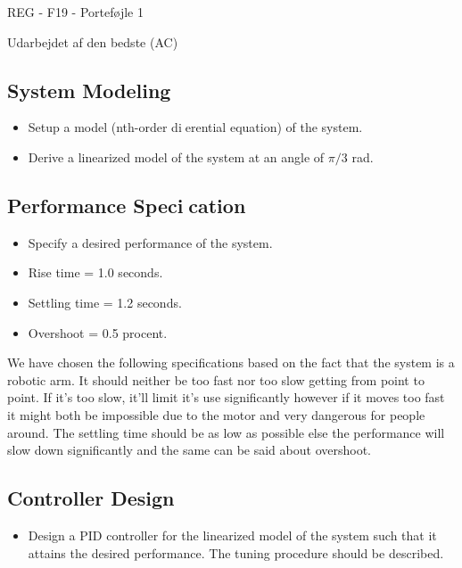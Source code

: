 \documentclass[12pt]{article}
\begin{document}
\raggedright
\huge
REG - F19 - Porteføjle 1 \linebreak
\normalsize

\large
Udarbejdet af den bedste (AC)

\subsection*{System Modeling}
\begin{itemize}
  \item Setup a model (nth-order dierential equation) of the system.
  \item Derive a linearized model of the system at an angle of $\pi/3$ rad.
\end{itemize}

\subsection*{Performance Specication}
\begin{itemize}
  \item Specify a desired performance of the system.
\end{itemize}

\begin{itemize}
  \item Rise time = 1.0 seconds.
  \item Settling time = 1.2 seconds.
  \item Overshoot = 0.5 procent.

\end{itemize}
We have chosen the following specifications based on the fact that the system is a robotic arm. It should neither be too fast nor too slow getting from point to point. If it's too slow, it'll limit it's use significantly however if it moves too fast it might both be impossible due to the motor and very dangerous for people around. The settling time should be as low as possible else the performance will slow down significantly and the same can be said about overshoot.
\subsection*{Controller Design}
\begin{itemize}
  \item Design a PID controller for the linearized model of the system such that it attains the desired performance. The tuning procedure should be described.
\end{itemize}
\end{document}
